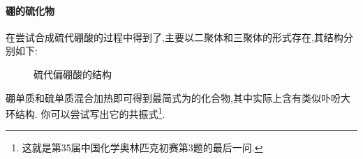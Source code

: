 \documentclass{ctexart}
\begin{document}
\paragraph{硼的硫化物}
在尝试合成硫代硼酸的过程中得到了,主要以二聚体和三聚体的形式存在,其结构分别如下:
\begin{figure}[H]
    \centering
    \caption{硫代偏硼酸的结构}
\end{figure}
\indent 硼单质和硫单质混合加热即可得到最简式为的化合物,其中实际上含有类似卟吩大环结构.
你可以尝试写出它的共振式\footnote{这就是第35届中国化学奥林匹克初赛第3题的最后一问.}.
\end{document}
